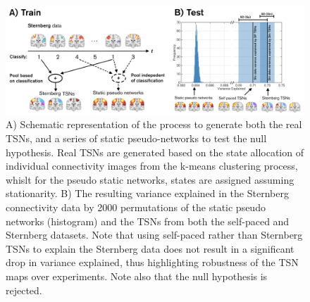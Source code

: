 \begin{landscape}
\begin{figure}
	\begin{center}
		\includegraphics[width=\linewidth]{./images/chapter5/Figure_4.png}
		\caption{A) Schematic representation of the process to generate both the real TSNs, and a series of static pseudo-networks to test the null hypothesis. Real TSNs are generated based on the state allocation of individual connectivity images from the k-means clustering process, whislt for the pseudo static networks, states are assigned assuming stationarity. B) The resulting variance explained in the Sternberg connectivity data by 2000 permutations of the static pseudo networks (histogram) and the TSNs from both the self-paced and Sternberg datasets. Note that using self-paced rather than Sternberg TSNs to explain the Sternberg data does not result in a significant drop in variance explained, thus highlighting robustness of the TSN maps over experiments. Note also that the null hypothesis is rejected. \label{figure_5_4}}
	\end{center}
\end{figure}
\end{landscape}

